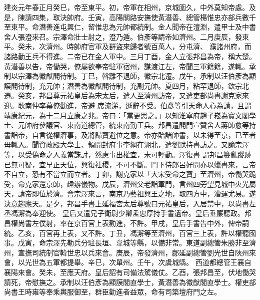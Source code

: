 \begin{pinyinscope}
 建炎元年春正月癸巳，帝至東平。初，帝軍在相州，京城圍久，中外莫知帝處。及是，陳請四集，取決帥府。壬寅，高陽關路安撫使黃潛善、總管楊惟忠亦部兵數千至東平。命潛善進屯興仁，留惟忠為元帥都統制。金人聞帝在澶淵，遣甲士及中書舍人張澄來召。宗澤命壯士射之，澄乃遁。伯彥等請帝如濟州。二月庚辰，發東平。癸未，次濟州。時帥府官軍及群盜來歸者號百萬人，分屯濟、
 濮諸州府，而諸路勤王兵不得進。二帝已在金人軍中。三月丁酉，金人立張邦昌為帝，稱大楚。黃潛善以告，帝慟哭，僚屬欲奉帝駐軍宿州，謀渡江左，帝聞三軍籍籍，遂輒。承制以宗澤為徽猷閣待制。丁巳，斡離不退師，徽宗北遷。戊午，承制以汪伯彥為顯謨閣待制，充元帥；潛善為徽猷閣待制，充副元帥。夏四月，粘罕退師，欽宗北遷。癸亥，邦昌尊元祐皇后為宋太后，遣人至濟州訪帝，又遣吏部尚書謝克家來迎。耿南仲率幕僚勸進，帝避
 席流涕，遜辭不受。伯彥等引天命人心為請，且謂靖康紀元，為十二月立康之兆。帝曰：「當更思之。」以知淮寧府趙子崧為寶文閣學士、元帥府參議官、東南道總管，統東南勤王兵。邦昌遣閣門宣贊舍人蔣師愈等持書詣帝，自言從權濟事，及將歸寶避位之意。帝亦貽諸帥書，以未得至京，已至者毋輒入。聞資政殿大學士、領開封府事李綱在湖北，遣劉默持書訪之。又諭宗澤等，以受偽命之人義當誅討，然慮事出權宜，未可輕動。澤復書
 謂邦昌篡亂蹤跡已無可疑，宜早正天位，興復社稷，不可不斷。門下侍郎呂好問亦以蠟書來，言帝不自立，恐有不當立而立者。丁卯，謝克家以「大宋受命之寶」至濟州，帝慟哭跪受，命克家還京師，趣辦儀物。戊辰，濟州父老詣軍門，言州四旁望見城中火光屬天，請帝即位於濟。會宗澤來言，南京乃藝祖興王之地，取四方中，漕運尤易。遂決意趨應天。是夕，邦昌手書上延福宮太后尊號曰元祐皇后，入居禁中，以尚書左丞馮澥為奉迎使。
 皇后又遣兄子衛尉少卿孟忠厚持手書遺帝。皇后垂簾聽政。邦昌權尚書左僕射，率在京百官上表勸進，不許。甲戌，皇后手書告中外，俾帝嗣統。乙亥，百官再上表，又不許。丁丑，馮澥等至濟州，百官三上表，許以權聽國事。戊寅，命宗澤先勒兵分駐長垣、韋城等縣，以備非常。東道副總管朱勝非至濟州，宣撫司統制官韓世忠以兵來會。庚辰，帝發濟州，鄜延副總管劉光世自陜州來會，以光世為五軍都提舉。辛巳，次單州。壬午，次虞城縣。
 西道都總管王襄自襄陽來會。癸未，至應天府。皇后詔有司備法駕儀仗。乙酉，張邦昌至，伏地慟哭請死，帝慰撫之。承制以汪伯彥為顯謨閣直學士，黃潛善為徽猷閣直學士。權吏部尚書王時雍等奉乘輿服御至，群臣勸進者益眾，命有司築壇府門之左。




\end{pinyinscope}
